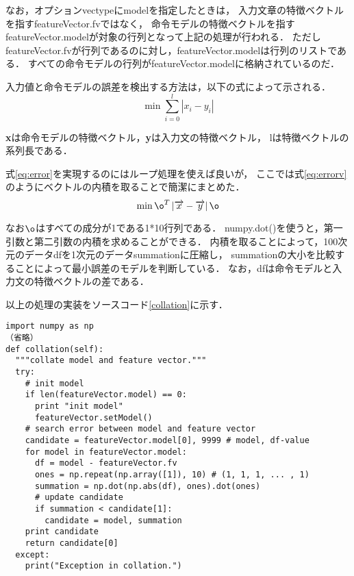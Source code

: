 \documentclass{jsarticle}
\begin{document}
\begin{multicols}{2}
なお，オプションvectypeにmodelを指定したときは，
入力文章の特徴ベクトルを指すfeatureVector.fvではなく，
命令モデルの特徴ベクトルを指すfeatureVector.modelが対象の行列となって上記の処理が行われる．
ただしfeatureVector.fvが行列であるのに対し，featureVector.modelは行列のリストである．
すべての命令モデルの行列がfeatureVector.modelに格納されているのだ．

入力値と命令モデルの誤差を検出する方法は，以下の式によって示される．
\begin{equation}
\label{eq:error}
\min { \sum _{ i=0 }^{ l }{ \left| { x }_{ i }-{ y }_{ i } \right|  }  } 
\end{equation}

{\bf x}は命令モデルの特徴ベクトル，{\bf y}は入力文の特徴ベクトル，
lは特徴ベクトルの系列長である．

式\ref{eq:error}を実現するのにはループ処理を使えば良いが，
ここでは式\ref{eq:errorv}のようにベクトルの内積を取ることで簡潔にまとめた．
\begin{equation}
\label{eq:errorv}
\min { { \o  }^{ T }\left| \overrightarrow { x } -\overrightarrow { y }  \right| \o  } 
\end{equation}

なお$\o$はすべての成分が1である1*10行列である．
numpy.dot()を使うと，第一引数と第二引数の内積を求めることができる．
内積を取ることによって，100次元のデータdfを1次元のデータsummationに圧縮し，
summationの大小を比較することによって最小誤差のモデルを判断している．
なお，dfは命令モデルと入力文の特徴ベクトルの差である．

以上の処理の実装をソースコード\ref{collation}に示す．

\begin{lstlisting}[caption=RaspiAudio/semanticAnalysis/semanticAnalysis.py,label=collation]
import numpy as np
（省略）
def collation(self):
  """collate model and feature vector."""
  try:
    # init model
    if len(featureVector.model) == 0:
      print "init model"
      featureVector.setModel()
    # search error between model and feature vector
    candidate = featureVector.model[0], 9999 # model, df-value
    for model in featureVector.model:
      df = model - featureVector.fv
      ones = np.repeat(np.array([1]), 10) # (1, 1, 1, ... , 1)
      summation = np.dot(np.abs(df), ones).dot(ones)
      # update candidate
      if summation < candidate[1]:
        candidate = model, summation 
    print candidate
    return candidate[0]
  except:
    print("Exception in collation.")
\end{lstlisting}


\end{multicols}
\end{document}
